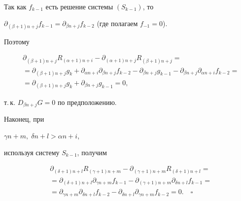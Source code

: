 Так как $f_{k-1}$ есть решение системы $(S_{k-1})$, то


$\partial_{(\beta + 1)n + j}f_{k-1} =


\partial_{\beta n + j}f_{k-2}$ (где полагаем $f_{-1} = 0$).


Поэтому


\begin{align*}


&\partial_{(\beta + 1)n + j}R_{(\alpha + 1)n + i} -


\partial_{(\alpha + 1)n + j}R_{(\beta + 1)n + j} = \\


&=\partial_{(\beta + 1)n + j}g_k +


\partial_{\alpha n + i}\partial_{\beta n + j}f_{k-2} -


\partial_{\beta n + j}g_{k-1} -


\partial_{\beta n + j}\partial_{\alpha n + i}f_{k-2} = \\


&=\partial_{(\beta + 1)n + j}g_k +


\partial_{\beta n + j}g_{k-1}  = 0,


\end{align*}


т.\,к. $D_{\beta n + j}G = 0$ по предположению.





Наконец, при


$\gamma n + m,\; \delta n + l > \alpha n + i$,


используя систему $S_{k-1}$, получим


\begin{align*}


&\partial_{(\delta + 1)n + l}R_{(\gamma + 1)n + m} -


\partial_{(\gamma + 1)n + m}R_{(\delta + 1)n + l} =\\


&=\partial_{(\delta + 1)n + l}\partial_{\gamma n + m}f_{k-1}


-\partial_{(\gamma + 1)n + m}\partial_{\delta n + l}f_{k-1} =\\


&=\partial_{\gamma n + m}\partial_{\delta n + l}f_{k-2}


-\partial_{\delta n + l}\partial_{\gamma n + m}f_{k-2} = 0.\quad\square


\end{align*}






